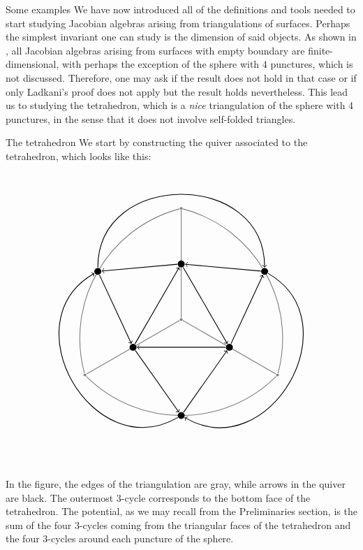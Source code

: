 \begin{chapter}{Some examples}
We have now introduced all of the definitions and tools needed to start studying Jacobian algebras arising from triangulations of surfaces. Perhaps the simplest invariant one can study is the dimension of said objects. As shown in \cite{Lad12}, all Jacobian algebras arising from surfaces with empty boundary are finite-dimensional, with perhaps the exception of the sphere with 4 punctures, which is not discussed. Therefore, one may ask if the result does not hold in that case or if only Ladkani's proof does not apply but the result holds nevertheless. This lead us to studying the tetrahedron, which is a \emph{nice} triangulation of the sphere with 4 punctures, in the sense that it does not involve self-folded triangles.

\begin{section}{The tetrahedron}
We start by constructing the quiver associated to the tetrahedron, which looks like this:
\[
\begin{tikzpicture}[thick]
\tikzstyle{every node} = [circle, fill=gray, minimum size=.1cm, inner sep=0cm]
\node (c) at (0,0) {};
\node (n) at (0,4) {};
\node (sw) at (210:4) {};
\node (se) at (330:4) {};
\draw[gray] (c) -- (sw)
	(c) -- (n)
	(c) -- (se)
	(sw) to [bend right = 45] coordinate[midway](m1) (se)
	(n) to [bend right = 45] coordinate[midway](m2) (sw)
	(se) to [bend right = 45] coordinate[midway](m3) (n);
\tikzstyle{every node} = [circle, fill=black, minimum size=.25cm, inner sep=0cm]
\node (in) at (0,2) {};
\node (isw) at (210:2) {};
\node (ise) at (330:2) {};
\node (os) at (m1) {};
\node (onw) at (m2) {};
\node (one) at (m3) {};
\draw[->] (in) -- (onw);
\draw[->] (onw) -- (isw);
\draw[->] (isw) -- (in);
\draw[->] (in) -- (ise);
\draw[->] (ise) -- (isw);
\draw[->] (ise) -- (one);
\draw[->] (one) -- (in);
\draw[->] (isw) -- (os);
\draw[->] (os) -- (ise);
\draw[->] (one) to [bend left=90, distance=100] (os);
\draw[->] (onw) to [bend left=90, distance=100] (one);
\draw[->] (os) to [bend left=90, distance=100] (onw);
\end{tikzpicture}
\]
In the figure, the edges of the triangulation are gray, while arrows in the quiver are black. The outermost 3-cycle corresponds to the bottom face of the tetrahedron. The potential, as we may recall from the Preliminaries section, is the sum of the four 3-cycles coming from the triangular faces of the tetrahedron and the four 3-cycles around each puncture of the sphere.


\end{section}
\end{chapter}
